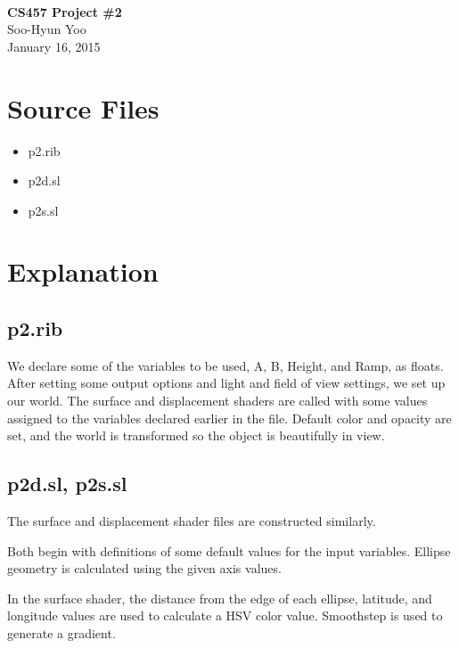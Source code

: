 \documentclass[12pt,letterpaper]{article}
\begin{document}
\fancyfoot{}
\begin{center}
    \hfill \\
    \vspace{4in}
    {\bf\Huge CS457 Project \#2 \\}
    \vspace{2in}
    {\Large Soo-Hyun Yoo \\ January 16, 2015}
\end{center}

\newpage
{}

\section*{Source Files}

\begin{itemize}
    \item p2.rib
    \item p2d.sl
    \item p2s.sl
\end{itemize}


\section*{Explanation}

\subsection*{p2.rib}

We declare some of the variables to be used, A, B, Height, and Ramp, as floats.
After setting some output options and light and field of view settings, we set
up our world. The surface and displacement shaders are called with some values
assigned to the variables declared earlier in the file. Default color and
opacity are set, and the world is transformed so the object is beautifully in
view.

\subsection*{p2d.sl, p2s.sl}

The surface and displacement shader files are constructed similarly.

Both begin with definitions of some default values for the input variables.
Ellipse geometry is calculated using the given axis values.

In the surface shader, the distance from the edge of each ellipse, latitude,
and longitude values are used to calculate a HSV color value. Smoothstep is
used to generate a gradient.
\end{document}
